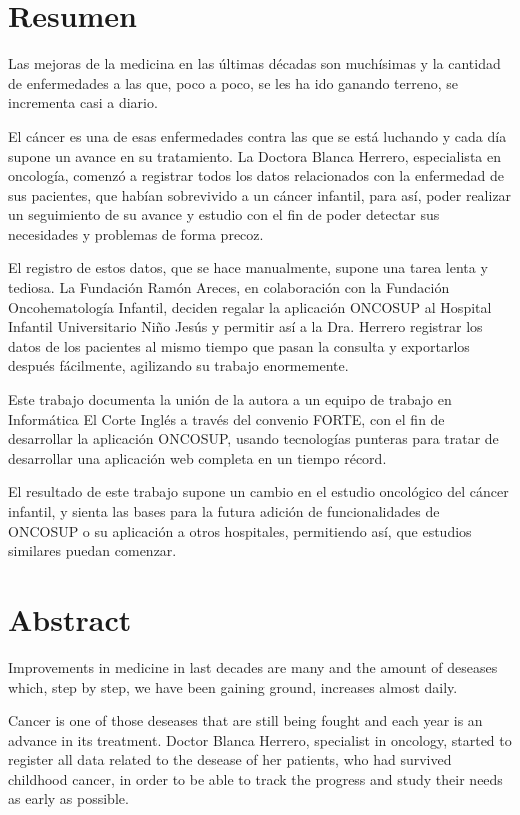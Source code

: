 \chapter{Resumen}

Las mejoras de la medicina en las últimas décadas son muchísimas y la cantidad de enfermedades a las que, poco a poco, se les ha ido ganando terreno, se incrementa casi a diario.

El cáncer es una de esas enfermedades contra las que se está luchando y cada día supone un avance en su tratamiento. La Doctora Blanca Herrero, especialista en oncología, comenzó a registrar todos los datos relacionados con la enfermedad de sus pacientes, que habían sobrevivido a un cáncer infantil, para así, poder realizar un seguimiento de su avance y  estudio con el fin de poder detectar sus necesidades y problemas de forma precoz.

El registro de estos datos, que se hace manualmente, supone una tarea lenta y tediosa. La Fundación Ramón Areces, en colaboración con la Fundación Oncohematología Infantil, deciden regalar la aplicación ONCOSUP al Hospital Infantil Universitario Niño Jesús y permitir así a la Dra. Herrero registrar los datos de los pacientes al mismo tiempo que pasan la consulta y exportarlos después fácilmente, agilizando su trabajo enormemente.

Este trabajo documenta la unión de la autora a un equipo de trabajo en Informática El Corte Inglés a través del convenio FORTE, con el fin de desarrollar la aplicación ONCOSUP, usando tecnologías punteras para tratar de desarrollar una aplicación web completa en un tiempo récord.

El resultado de este trabajo supone un cambio en el estudio oncológico del cáncer infantil, y sienta las bases para la futura adición de funcionalidades de ONCOSUP o su aplicación a otros hospitales, permitiendo así, que estudios similares puedan comenzar.


\chapter{Abstract}

Improvements in medicine in last decades are many and the amount of deseases which, step by step, we have been gaining ground, increases almost daily.

Cancer is one of those deseases that are still being fought and each year is an advance in its treatment. Doctor Blanca Herrero, specialist in oncology, started to register all data related to the desease of her patients, who had survived childhood cancer, in order to be able to track the progress and study their needs as early as possible.

